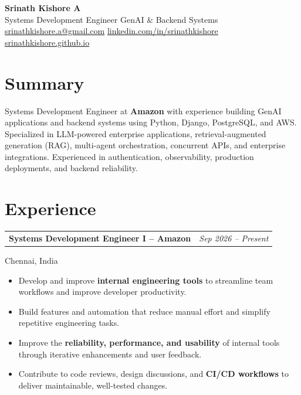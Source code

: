 \documentclass[11pt,a4paper]{article}
\makeatletter
\newcommand{\entryheader}[2]{%
  \begin{tabularx}{\textwidth}{@{}X r@{}}
    \textbf{#1} & \textit{#2}
  \end{tabularx}%
}
\makeatother
\begin{document}
\begin{center}
  {\LARGE \textbf{Srinath Kishore A}}\\[3pt]
  \normalsize
  Systems Development Engineer
  \textbar{} GenAI \& Backend Systems\\[4pt]
  \small
  \href{mailto:srinathkishore.a@gmail.com}
       {srinathkishore.a@gmail.com}
  \textbar{}
  \href{https://linkedin.com/in/srinathkishore}
       {linkedin.com/in/srinathkishore}
  \textbar{}
  \href{https://srinathkishore.github.io}
       {srinathkishore.github.io}
\end{center}

\vspace{-3pt}

\section*{Summary}

Systems Development Engineer at \textbf{Amazon} with experience
building GenAI applications and backend systems using Python,
Django, PostgreSQL, and AWS. Specialized in LLM-powered enterprise
applications, retrieval-augmented generation (RAG), multi-agent
orchestration, concurrent APIs, and enterprise integrations.
Experienced in authentication, observability, production
deployments, and backend reliability.

\section*{Experience}

\entryheader
  {Systems Development Engineer I -- Amazon}
  {Sep 2026 -- Present}
Chennai, India

\begin{itemize}
  \item Develop and improve \textbf{internal engineering tools}
  to streamline team workflows and improve developer productivity.

  \item Build features and automation that reduce manual effort
  and simplify repetitive engineering tasks.

  \item Improve the \textbf{reliability, performance, and usability}
  of internal tools through iterative enhancements and user feedback.

  \item Contribute to code reviews, design discussions, and
  \textbf{CI/CD workflows} to deliver maintainable, well-tested changes.
\end{itemize}
\end{document}
